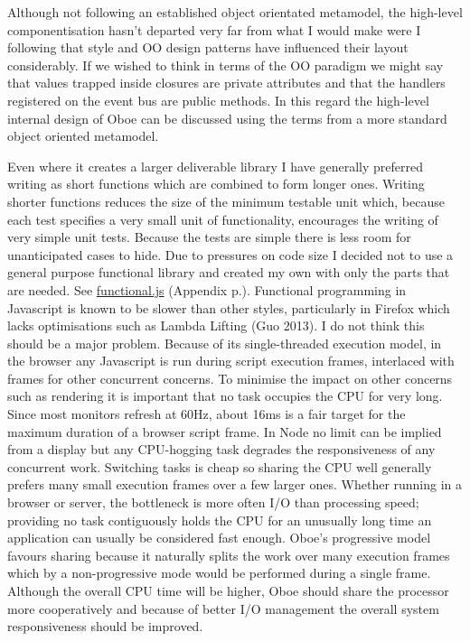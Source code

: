\documentclass[12pt, ]{article}
\begin{document}
Although not following an established object orientated metamodel, the
high-level componentisation hasn't departed very far from what I would
make were I following that style and OO design patterns have influenced
their layout considerably. If we wished to think in terms of the OO
paradigm we might say that values trapped inside closures are private
attributes and that the handlers registered on the event bus are public
methods. In this regard the high-level internal design of Oboe can be
discussed using the terms from a more standard object oriented
metamodel.

Even where it creates a larger deliverable library I have generally
preferred writing as short functions which are combined to form longer
ones. Writing shorter functions reduces the size of the minimum testable
unit which, because each test specifies a very small unit of
functionality, encourages the writing of very simple unit tests. Because
the tests are simple there is less room for unanticipated cases to hide.
Due to pressures on code size I decided not to use a general purpose
functional library and created my own with only the parts that are
needed. See \hyperref[headerux5ffunctional]{functional.js} (Appendix
p.\pageref{src_functional}). Functional programming in Javascript is
known to be slower than other styles, particularly in Firefox which
lacks optimisations such as Lambda Lifting (Guo 2013). I do not think
this should be a major problem. Because of its single-threaded execution
model, in the browser any Javascript is run during script execution
frames, interlaced with frames for other concurrent concerns. To
minimise the impact on other concerns such as rendering it is important
that no task occupies the CPU for very long. Since most monitors refresh
at 60Hz, about 16ms is a fair target for the maximum duration of a
browser script frame. In Node no limit can be implied from a display but
any CPU-hogging task degrades the responsiveness of any concurrent work.
Switching tasks is cheap so sharing the CPU well generally prefers many
small execution frames over a few larger ones. Whether running in a
browser or server, the bottleneck is more often I/O than processing
speed; providing no task contiguously holds the CPU for an unusually
long time an application can usually be considered fast enough. Oboe's
progressive model favours sharing because it naturally splits the work
over many execution frames which by a non-progressive mode would be
performed during a single frame. Although the overall CPU time will be
higher, Oboe should share the processor more cooperatively and because
of better I/O management the overall system responsiveness should be
improved.
\end{document}
